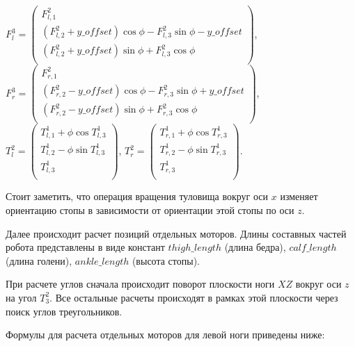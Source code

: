 \begin{center}
$F^{3}_{l} = \begin{pmatrix}
F^{2}_{l,1} \\
(F^{2}_{l,2} + y\_offset) \cos \phi - F^{2}_{l,3} \sin \phi - y\_offset \\
(F^{2}_{l,2} + y\_offset) \sin \phi + F^{2}_{l,3} \cos \phi \\
\end{pmatrix}$, $F^{3}_{r} = \begin{pmatrix}
F^{2}_{r,1} \\
(F^{2}_{r,2} - y\_offset) \cos \phi - F^{2}_{r,3} \sin \phi + y\_offset \\
(F^{2}_{r,2} - y\_offset) \sin \phi + F^{2}_{r,3} \cos \phi \\
\end{pmatrix}$,\\
$T^{2}_{l} = \begin{pmatrix}
T^{1}_{l,1} + \phi \cos T^{1}_{l,3} \\
T^{1}_{l,2} - \phi \sin T^{1}_{l,3} \\
T^{1}_{l,3} \\
\end{pmatrix}$,
$T^{2}_{r} = \begin{pmatrix}
T^{1}_{r,1} + \phi \cos T^{1}_{r,3}  \\
T^{1}_{r,2} - \phi \sin T^{1}_{r,3}  \\
T^{1}_{r,3} \\
\end{pmatrix}$.
\end{center}

Стоит заметить, что операция вращения туловища вокруг оси $x$ изменяет ориентацию стопы в зависимости от ориентации этой стопы по оси $z$.

Далее происходит расчет позиций отдельных моторов. Длины составных частей робота представлены в виде констант $thigh\_length$ (длина бедра), $calf\_length$ (длина голени), $ankle\_length$ (высота стопы).

При расчете углов сначала происходит поворот плоскости ноги $XZ$ вокруг оси $z$ на угол $T^{2}_{3}$. Все остальные расчеты происходят в рамках этой плоскости через поиск углов треугольников. 

Формулы для расчета отдельных моторов для левой ноги приведены ниже:

